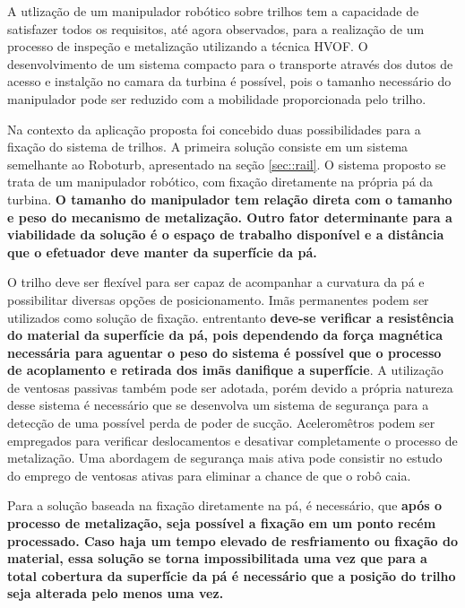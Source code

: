 
 
A utlização de um manipulador robótico sobre trilhos tem a capacidade de
satisfazer todos os requisitos, até agora observados, para a realização de um
processo de inspeção e metalização utilizando a técnica HVOF. O desenvolvimento
de um sistema compacto para o transporte através dos dutos de acesso e instalção
no camara da turbina é possível, pois o tamanho necessário do manipulador pode
ser reduzido com a mobilidade proporcionada pelo trilho. 

Na contexto da aplicação proposta foi concebido duas possibilidades para a
fixação do sistema de trilhos. A primeira solução consiste em um sistema
semelhante ao Roboturb, apresentado na seção \ref{sec::rail}. O sistema proposto
se trata de um manipulador robótico, com fixação diretamente na própria pá da
turbina. \textbf{O tamanho do manipulador tem relação direta com o tamanho e
peso do mecanismo de metalização. Outro fator determinante para a viabilidade da
solução é o espaço de trabalho disponível e a distância que o efetuador deve
manter da superfície da pá.}

O trilho deve ser flexível para ser capaz de acompanhar a curvatura da pá e
possibilitar diversas opções de posicionamento. Imãs permanentes podem ser
utilizados como solução de fixação. entrentanto \textbf{deve-se verificar a
resistência do material da superfície da pá, pois dependendo da força magnética
necessária para aguentar o peso do sistema é possível que o processo de
acoplamento e retirada dos imãs danifique a superfície}. A utilização de
ventosas passivas também pode ser adotada, porém devido a própria natureza desse
sistema é necessário que se desenvolva um sistema de segurança para a detecção
de uma possível perda de poder de sucção. Aceleromêtros podem ser empregados
para verificar deslocamentos e desativar completamente o processo de
metalização. Uma abordagem de segurança mais ativa pode consistir no estudo do
emprego de ventosas ativas para eliminar a chance de que o robô caia.

Para a solução baseada na fixação diretamente na pá, é necessário, que
\textbf{após o processo de metalização, seja possível a fixação em um ponto
recém processado. Caso haja um tempo elevado de resfriamento ou fixação do
material, essa solução se torna impossibilitada uma vez que para a total
cobertura da superfície da pá é necessário que a posição do trilho seja alterada
pelo menos uma vez.}


